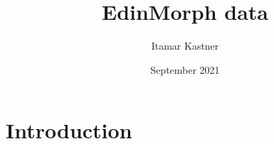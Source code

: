 \documentclass{article}
\title{EdinMorph data}
\author{Itamar Kastner}
\date{September 2021}
\begin{document}
\maketitle

\section{Introduction}
\end{document}
